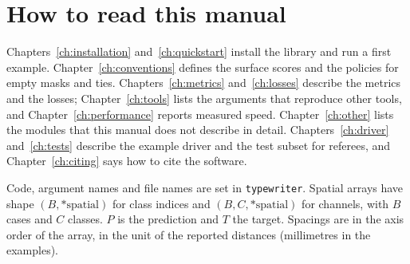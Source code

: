 \section{How to read this manual}\label{introduction:reading}

Chapters~\ref{ch:installation} and~\ref{ch:quickstart} install the library and run a first
example. Chapter~\ref{ch:conventions} defines the surface scores and the policies for empty
masks and ties. Chapters~\ref{ch:metrics} and~\ref{ch:losses} describe the metrics and the
losses; Chapter~\ref{ch:tools} lists the arguments that reproduce other tools, and
Chapter~\ref{ch:performance} reports measured speed. Chapter~\ref{ch:other} lists the modules
that this manual does not describe in detail. Chapters~\ref{ch:driver} and~\ref{ch:tests}
describe the example driver and the test subset for referees, and Chapter~\ref{ch:citing}
says how to cite the software.

Code, argument names and file names are set in \texttt{typewriter}. Spatial arrays have shape
$(B,\ast\text{spatial})$ for class indices and $(B,C,\ast\text{spatial})$ for channels, with $B$
cases and $C$ classes. $P$ is the prediction and $T$ the target. Spacings are in the axis
order of the array, in the unit of the reported distances (millimetres in the examples).
